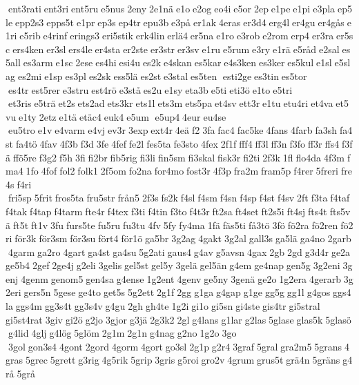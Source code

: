  ent3rati ent3ri ent5ru e5nus 2eny 2e1nä e1o e2og eo4i e5or 2ep e1pe e1pi e3pla ep5le epp2s3 epps5t e1pr ep3s ep4tr epu3b e3på er1ak 4eras er3d4 erg4l er4gu er4gås e1ri e5rib e4rinf erings3 eri5stik erk4lin erlä4 er5na e1ro e3rob e2rom erp4 er3ra er5sc ers4ken er3sl ers4le er4sta er2ste er3str er3sv e1ru e5rum e3ry e1rä e5råd e2sal es5all es3arm e1sc 2ese es4hi esi4u es2k e4skan es5kar e4s3ken es3ker es5kul e1sl e5slag es2mi e1sp es3pl es2sk ess5lä es2st e3stal es5ten  esti2ge es3tin es5tor  es4tr est5rer e3stru est4rö e3stå es2u e1sy eta3b e5ti eti3ö e1to e5tri  et3ris e5trä et2s ets2ad ets3kr ets1l ets3m ets5pa et4sv ett3r e1tu etu4ri et4va et5vu e1ty 2etz e1tä etäc4 euk4 e5um  e5up4 4eur eu4se  eu5tro e1v e4varm e4vj ev3r 3exp ext4r 4eä f2 3fa fac4 fac5ke 4fans 4farb fa3sh fa4st fa4tö 4fav 4f3b f3d 3fe 4fef fe2l fes5ta fe3sto 4fex 2f1f fff4 ff3l ff3n f3fo ff3r ffs4 f3fä ffö5re f3g2 f5h 3fi fi2br fib5rig fi3li fin5sm fi3skal fisk3r fi2ti 2f3k 1fl flo4da 4f3m fma4 1fo 4fof fol2 folk1 2f5om fo2na for4mo fost3r 4f3p fra2m fram5p f4rer 5freri fre4s f4ri  fri5sp 5frit fros5ta fru5str från5 2f3s fs2k f4sl f4sm f4sn f4sp f4st f4sv 2ft f3ta f4taf f4tak f4tap f4tarm fte4r f4tex f3ti f4tin f3to f4t3r ft2sa ft4set ft2s5i ft4sj fts4t fts5vä ft5t ft1v 3fu furs5te fu5ru fu3tu 4fv 5fy fy4ma 1fä fäs5ti få3tö 3fö fö2ra fö2ren fö2ri för3k för3sm för3su fört4 för1ö ga5br 3g2ag 4gakt 3g2al gall3s ga5lä ga4no 2garb 4garm ga2ro 4gart ga4st ga4su 5g2ati gaus4 g4av g5avsn 4gax 2gb 2gd g3d4r ge2a ge5b4 2gef 2ge4j g2eli 3gelis gel5st gel5y 3gelä gel5än g4em ge4nap gen5g 3g2eni 3genj 4genm genom5 gen4sa g4ense 1g2ent 4genv ge5ny 3genä ge2o 1g2era 4gerarb 3g2eri gers5n 5gese ge4to get5s 5g2ett 2g1f 2gg g1ga g4gap g1ge gg5g gg1l g4gos ggs4la ggs4m gg3s4t gg3s4v g4gu 2gh gh4te 1g2i gi1o gi5sn gi4ste gis4tr gi5stral 	gi5st4rat 3giv gi2ö g2jo 3gjor g3jä 2g3k2 2gl g4lans g1lar g2las 5glase glas5k 5glasö g4lid 4glj g4lög 5glöm 2g1m 2g1n g4nag g2no 1g2o 3go  3gol gon3s4 4gont 2gord 4gorm 4gort go3sl 2g1p g2r4 3graf 5gral gra2m5 5grans 4gras 5grec 5grett g3rig 4g5rik 5grip 3gris g5roi gro2v 4grum grus5t grä4n 5gräns g4rå 5grå 